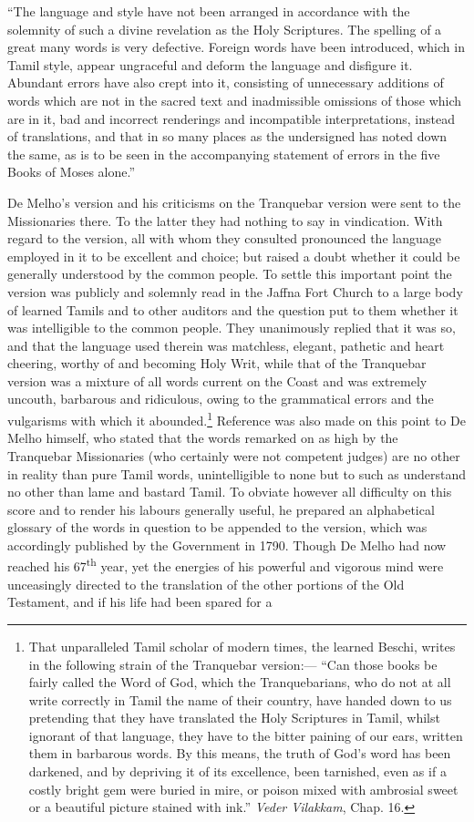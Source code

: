 \documentclass{article}
\begin{document}
``The language and style have not been arranged in accordance with the solemnity of such a divine revelation as the Holy Scriptures. The spelling of a great many words is very defective. Foreign words have been introduced, which in Tamil style, appear ungraceful and deform the language and disfigure it. Abundant errors have also crept into it, consisting of unnecessary additions of words which are not in the sacred text and inadmissible omissions of those which are in it, bad and incorrect renderings and incompatible interpretations, instead of translations, and that in so many places as the undersigned has noted down the same, as is to be seen in the accompanying statement of errors in the five Books of Moses alone.''

De Melho's version and his criticisms on the Tranquebar version were sent to the Missionaries there. To the latter they had nothing to say in vindication. With regard to the version, all with whom they consulted pronounced the language employed in it to be excellent and choice; but raised a doubt whether it could be generally understood by the common people. To settle this important point the version was publicly and solemnly read in the Jaffna Fort Church to a large body of learned Tamils and to other auditors and the question put to them whether it was intelligible to the common people. They unanimously replied that it was so, and that the language used therein was matchless, elegant, pathetic and heart cheering, worthy of and becoming Holy Writ, while that of the Tranquebar version was a mixture of all words current on the Coast and was extremely uncouth, barbarous and ridiculous, owing to the grammatical errors and the vulgarisms with which it abounded.\footnote{That unparalleled Tamil scholar of modern times, the learned Beschi, writes in the following strain of the Tranquebar version:--- ``Can those books be fairly called the Word of God, which the Tranquebarians, who do not at all write correctly in Tamil the name of their country, have handed down to us pretending that they have translated the Holy Scriptures in Tamil, whilst ignorant of that language, they have to the bitter paining of our ears, written them in barbarous words. By this means, the truth of God's word has been darkened, and by depriving it of its excellence, been tarnished, even as if a costly bright gem were buried in mire, or poison mixed with ambrosial sweet or a beautiful picture stained with ink.'' \emph{Veder Vilakkam}, Chap. 16.} Reference was also made on this point to De Melho himself, who stated that the words remarked on as high by the Tranquebar Missionaries (who certainly were not competent judges) are no other in reality than pure Tamil words, unintelligible to none but to such as understand no other than lame and bastard Tamil. To obviate however all difficulty on this score and to render his labours generally useful, he prepared an alphabetical glossary of the words in question to be appended to the version, which was accordingly published by the Government in 1790. Though De Melho had now reached his 67\textsuperscript{th} year, yet the energies of his powerful and vigorous mind were unceasingly directed to the translation of the other portions of the Old Testament, and if his life had been spared for a 
\end{document}
